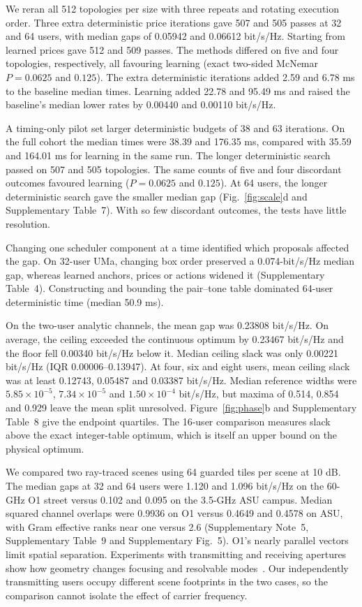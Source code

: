 \documentclass[11pt,letterpaper]{article}
\begin{document}
We reran all 512 topologies per size with three repeats and rotating execution order. Three extra deterministic price iterations gave 507 and 505 passes at 32 and 64 users, with median gaps of 0.05942 and 0.06612 bit/s/Hz. Starting from learned prices gave 512 and 509 passes. The methods differed on five and four topologies, respectively, all favouring learning (exact two-sided McNemar \(P=0.0625\) and \(0.125\)). The extra deterministic iterations added 2.59 and 6.78 ms to the baseline median times. Learning added 22.78 and 95.49 ms and raised the baseline's median lower rates by 0.00440 and 0.00110 bit/s/Hz.


A timing-only pilot set larger deterministic budgets of 38 and 63 iterations. On the full cohort the median times were 38.39 and 176.35 ms, compared with 35.59 and 164.01 ms for learning in the same run. The longer deterministic search passed on 507 and 505 topologies. The same counts of five and four discordant outcomes favoured learning (\(P=0.0625\) and \(0.125\)). At 64 users, the longer deterministic search gave the smaller median gap (Fig.~\ref{fig:scale}d and Supplementary Table~7). With so few discordant outcomes, the tests have little resolution.


Changing one scheduler component at a time identified which proposals affected the gap. On 32-user UMa, changing box order preserved a 0.074-bit/s/Hz median gap, whereas learned anchors, prices or actions widened it (Supplementary Table~4). Constructing and bounding the pair--tone table dominated 64-user deterministic time (median 50.9 ms).

On the two-user analytic channels, the mean gap was 0.23808 bit/s/Hz. On average, the ceiling exceeded the continuous optimum by 0.23467 bit/s/Hz and the floor fell 0.00340 bit/s/Hz below it. Median ceiling slack was only 0.00221 bit/s/Hz (IQR 0.00006--0.13947). At four, six and eight users, mean ceiling slack was at least 0.12743, 0.05487 and 0.03387 bit/s/Hz. Median reference widths were \(5.85\times10^{-5}\), \(7.34\times10^{-5}\) and \(1.50\times10^{-4}\) bit/s/Hz, but maxima of 0.514, 0.854 and 0.929 leave the mean split unresolved. Figure~\ref{fig:phase}b and Supplementary Table~8 give the endpoint quartiles. The 16-user comparison measures slack above the exact integer-table optimum, which is itself an upper bound on the physical optimum.


We compared two ray-traced scenes using 64 guarded tiles per scene at 10 dB. The median gaps at 32 and 64 users were 1.120 and 1.096 bit/s/Hz on the 60-GHz O1 street versus 0.102 and 0.095 on the 3.5-GHz ASU campus. Median squared channel overlaps were 0.9936 on O1 versus 0.4649 and 0.4578 on ASU, with Gram effective ranks near one versus 2.6 (Supplementary Note~5, Supplementary Table~9 and Supplementary Fig.~5). O1's nearly parallel vectors limit spatial separation. Experiments with transmitting and receiving apertures show how geometry changes focusing and resolvable modes~\cite{kludze2026,shenoam2026}. Our independently transmitting users occupy different scene footprints in the two cases, so the comparison cannot isolate the effect of carrier frequency.
\end{document}
